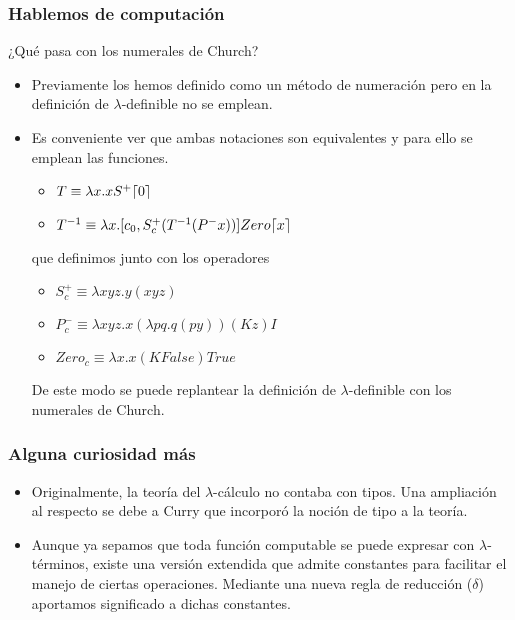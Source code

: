 \documentclass[spanish, a4paper, 12pt, final, slideColor, nototal, colorBG, pdf, noaccumulate, darkblue] {beamer}
\DeclarePairedDelimiter{\ceil}{\lceil}{\rceil}
\begin{document}
\begin{frame}
    \frametitle{Hablemos de computación}
    ¿Qué pasa con los numerales de Church?\\
    \begin{itemize}
        \item Previamente los hemos definido como un método de numeración pero en la definición de $\lambda$-definible no se emplean.
        \item Es conveniente ver que ambas notaciones son equivalentes y para ello se emplean las funciones.
        \begin{itemize}
            \item $T \equiv \lambda x.xS^{+}\ceil{0}$
            \item $T^{-1} \equiv \lambda x.[c_0, S^{+}_c (T^{-1}(P^{-}x))]Zero \ceil{x}$
        \end{itemize}
        que definimos junto con los operadores
        \begin{itemize}
            \item $S^{+}_c \equiv \lambda xyz.y(xyz)$
            \item $P^{-}_c \equiv \lambda xyz.x(\lambda pq.q(py))(Kz)I$
            \item $Zero_c \equiv \lambda x.x(K False)True$
        \end{itemize}
        De este modo se puede replantear la definición de $\lambda$-definible con los numerales de Church.
    \end{itemize}
\end{frame}
\begin{frame}
    \frametitle{Alguna curiosidad más}
    \begin{itemize}
        \item Originalmente, la teoría del $\lambda$-cálculo no contaba con tipos. Una ampliación al respecto se debe a Curry que incorporó la noción de tipo a la teoría.
        \item Aunque ya sepamos que toda función computable se puede expresar con $\lambda$-términos, existe una versión extendida que admite constantes para facilitar el manejo de ciertas operaciones. Mediante una nueva regla de reducción ($\delta$) aportamos significado a dichas constantes.
    \end{itemize}
\end{frame}
\end{document}
